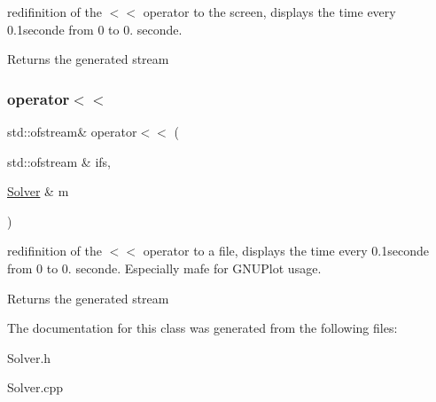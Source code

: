 redifinition of the $<$$<$ operator to the screen, displays the time every 0.\+1seconde from 0 to 0. seconde. \begin{DoxyReturn}{Returns}
the generated stream 
\end{DoxyReturn}
\mbox{\label{classSolver_a1771538d8a3459fdfb2cc37729141e22}} 
\subsubsection{\texorpdfstring{operator$<$$<$}{operator<<}\hspace{0.1cm}{\footnotesize\ttfamily [2/2]}}
{\footnotesize\ttfamily std\+::ofstream\& operator$<$$<$ (\begin{DoxyParamCaption}\item[{std\+::ofstream \&}]{ifs,  }\item[{\mbox{\hyperlink{classSolver}{Solver}} \&}]{m }\end{DoxyParamCaption})\hspace{0.3cm}{\ttfamily [friend]}}

redifinition of the $<$$<$ operator to a file, displays the time every 0.\+1seconde from 0 to 0. seconde. Especially mafe for G\+N\+U\+Plot usage. \begin{DoxyReturn}{Returns}
the generated stream 
\end{DoxyReturn}


The documentation for this class was generated from the following files\+:\begin{DoxyCompactItemize}
\item 
Solver.\+h\item 
Solver.\+cpp\end{DoxyCompactItemize}
